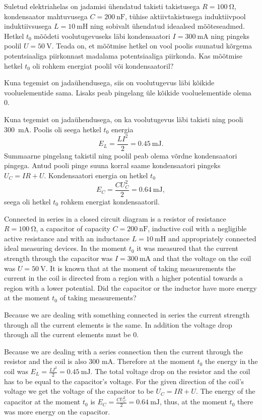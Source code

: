 
Suletud elektriahelas on jadamisi ühendatud takisti takistusega $R=\SI{100}{\ohm}$, kondensaator mahtuvusega $C=\SI{200}{\nano\farad}$, tühise aktiivtakistusega induktiivpool induktiivsusega $L=\SI{10}{\milli\henry}$ ning sobivalt ühendatud ideaalsed mõõteseadmed. Hetkel $t_0$ mõõdeti voolutugevuseks läbi kondensaatori $I=\SI{300}{\milli\ampere}$ ning pingeks poolil $U=\SI{50}{\volt}$. Teada on, et mõõtmise hetkel on vool poolis suunatud kõrgema potentsiaaliga piirkonnast madalama potentsiaaliga piirkonda. Kas mõõtmise hetkel $t_0$ oli rohkem energiat poolil või kondensaatoril? 

\hint
Kuna tegemist on jadaühendusega, siis on voolutugevus läbi kõikide vooluelementide sama. Lisaks peab pingelang üle kõikide vooluelementide olema \num{0}.

\solu
Kuna tegemist on jadaühendusega, on ka voolutugevus läbi takisti ning pooli \SI{300}{\milli\ampere}. Poolis oli seega hetkel $t_0$ energia 
\[
E_L=\frac{LI^2}{2}=\SI{0.45}{\milli\joule}.
\]
Summaarne pingelang takistil ning poolil peab olema võrdne kondensaatori pingega. Antud pooli pinge suuna korral saame kondensaatori pingeks $U_C=IR+U$. Kondensaatori energia on hetkel $t_0$ 
\[
E_C=\frac{CU_C^2}{2}=\SI{0.64}{\milli\joule},
\]
seega oli hetkel $t_0$ rohkem energiat kondensaatoril. 

Connected in series in a closed circuit diagram is a resistor of resistance $R=\SI{100}{\ohm}$, a capacitor of capacity $C=\SI{200}{\nano\farad}$, inductive coil with a negligible active resistance and with an inductance $L=\SI{10}{\milli\henry}$ and appropriately connected ideal measuring devices. In the moment $t_0$ it was measured that the current strength through the capacitor was $I=\SI{300}{\milli\ampere}$ and that the voltage on the coil was $U=\SI{50}{\volt}$. It is known that at the moment of taking measurements the current in the coil is directed from a region with a higher potential towards a region with a lower potential. Did the capacitor or the inductor have more energy at the moment $t_0$ of taking measurements?

\hinteng
Because we are dealing with something connected in series the current strength through all the current elements is the same. In addition the voltage drop through all the current elements must be 0.

\solueng
Because we are dealing with a series connection then the current through the resistor and the coil is also 300 mA. Therefore at the moment $t_0$ the energy in the coil was $E_L=\frac{LI^2}{2}=\SI{0.45}{\milli\joule}$. The total voltage drop on the resistor and the coil has to be equal to the capacitor’s voltage. For the given direction of the coil’s voltage we get the voltage of the capacitor to be $U_C=IR+U$. The energy of the capacitor at the moment $t_0$ is $E_C=\frac{CU_C^2}{2}=\SI{0.64}{\milli\joule}$, thus, at the moment $t_0$ there was more energy on the capacitor.
\probend